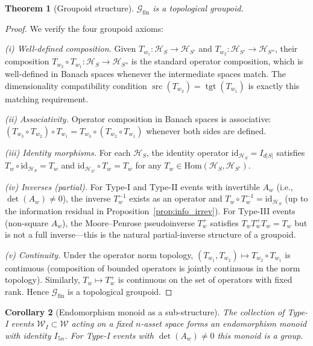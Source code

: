 \documentclass[12pt,a4paper]{article}
\theoremstyle{plain}
\newtheorem{theorem}{Theorem}[section]
\newtheorem{corollary}[theorem]{Corollary}
\theoremstyle{definition}
\newcommand{\Hil}{\mathcal{H}}
\newcommand{\1}{\mathbbm{1}}
\DeclareMathOperator{\src}{src}
\DeclareMathOperator{\tgt}{tgt}
\begin{document}
\begin{theorem}[Groupoid structure]
\label{thm:groupoid}
$\mathcal{G}_{\mathrm{fin}}$ is a topological groupoid.
\end{theorem}

\begin{proof}
We verify the four groupoid axioms:

\textit{(i) Well-defined composition.} Given $T_{w_1}: \Hil_S \to \Hil_{S'}$
and $T_{w_2}: \Hil_{S'} \to \Hil_{S''}$, their composition
$T_{w_2} \circ T_{w_1}: \Hil_S \to \Hil_{S''}$ is the standard
operator composition, which is well-defined in Banach spaces whenever the
intermediate spaces match. The dimensionality compatibility condition
$\src(T_{w_2}) = \tgt(T_{w_1})$ is exactly this matching requirement.

\textit{(ii) Associativity.} Operator composition in Banach spaces is
associative: $(T_{w_3}\circ T_{w_2})\circ T_{w_1}
= T_{w_3}\circ(T_{w_2}\circ T_{w_1})$ whenever both sides are defined.

\textit{(iii) Identity morphisms.} For each $\Hil_S$, the identity
operator $\mathrm{id}_{\Hil_S} = I_{d|S|}$ satisfies
$T_w \circ \mathrm{id}_{\Hil_S} = T_w$ and
$\mathrm{id}_{\Hil_{S'}} \circ T_w = T_w$ for any
$T_w \in \mathrm{Hom}(\Hil_S, \Hil_{S'})$.

\textit{(iv) Inverses (partial).} For Type-I and Type-II events with
invertible $A_w$ (i.e., $\det(A_w) \neq 0$), the inverse $T_w^{-1}$ exists
as an operator and $T_w \circ T_w^{-1} = \mathrm{id}_{\Hil_S}$
(up to the information residual in Proposition~\ref{prop:info_irrev}).
For Type-III events (non-square $A_w$), the Moore--Penrose pseudoinverse
$T_w^+$ satisfies $T_w T_w^+ T_w = T_w$ but is not a full inverse—this
is the natural partial-inverse structure of a groupoid.

\textit{(v) Continuity.} Under the operator norm topology,
$(T_{w_1}, T_{w_2}) \mapsto T_{w_2} \circ T_{w_1}$ is continuous
(composition of bounded operators is jointly continuous in the norm topology).
Similarly, $T_w \mapsto T_w^+$ is continuous on the set of operators
with fixed rank.  Hence $\mathcal{G}_{\mathrm{fin}}$ is a topological groupoid.
\end{proof}

\begin{corollary}[Endomorphism monoid as a sub-structure]
The collection of Type-I events $\mathcal{W}_I \subset \mathcal{W}$ acting
on a fixed $n$-asset space forms an \emph{endomorphism monoid} with
identity $I_{5n}$. For Type-I events with $\det(A_w) \neq 0$ this monoid
is a group.
\end{corollary}
\end{document}
